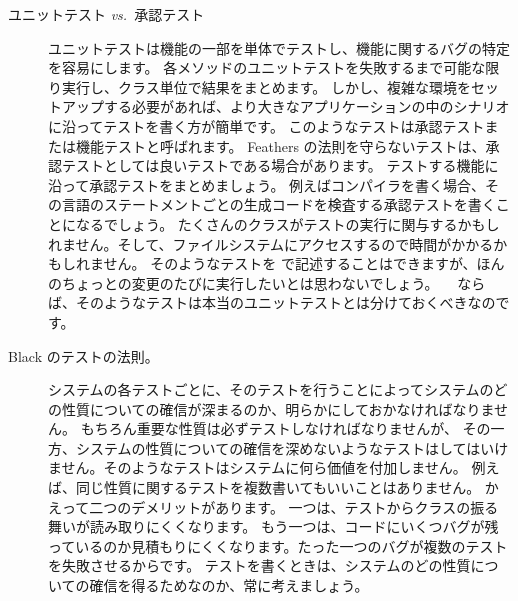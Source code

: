 \documentclass[a4paper,10pt,twoside]{book}
\begin{document}
\begin{description}
 \item[ユニットテスト \textit{vs.}\ 承認テスト]
  ユニットテストは機能の一部を単体でテストし、機能に関するバグの特定を容易にします。
  各メソッドのユニットテストを失敗するまで可能な限り実行し、クラス単位で結果をまとめます。%
  しかし、複雑な環境をセットアップする必要があれば、より大きなアプリケーションの中のシナリオに沿ってテストを書く方が簡単です。
  このようなテストは承認テストまたは機能テストと呼ばれます。
  Feathers の法則を守らないテストは、承認テストとしては良いテストである場合があります。
  テストする機能に沿って承認テストをまとめましょう。
  例えばコンパイラを書く場合、その言語のステートメントごとの生成コードを検査する承認テストを書くことになるでしょう。
  たくさんのクラスがテストの実行に関与するかもしれません。そして、ファイルシステムにアクセスするので時間がかかるかもしれません。
  そのようなテストを \sunit で記述することはできますが、ほんのちょっとの変更のたびに実行したいとは思わないでしょう。
　ならば、そのようなテストは本当のユニットテストとは分けておくべきなのです。

\item[Black のテストの法則。]
  システムの各テストごとに、そのテストを行うことによってシステムのどの性質についての確信が深まるのか、明らかにしておかなければなりません。
  もちろん重要な性質は必ずテストしなければなりませんが、
  その一方、システムの性質についての確信を深めないようなテストはしてはいけません。そのようなテストはシステムに何ら価値を付加しません。
  例えば、同じ性質に関するテストを複数書いてもいいことはありません。
  かえって二つのデメリットがあります。
  一つは、テストからクラスの振る舞いが読み取りにくくなります。
  もう一つは、コードにいくつバグが残っているのか見積もりにくくなります。たった一つのバグが複数のテストを失敗させるからです。
  テストを書くときは、システムのどの性質についての確信を得るためなのか、常に考えましょう。
\end{description}


\end{document}
